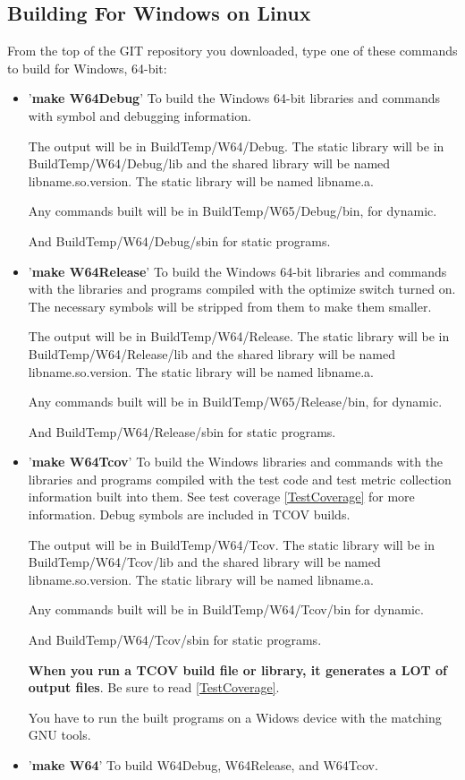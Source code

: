 \subsection{Building For Windows on Linux}
  
From the top of the GIT repository you downloaded,
type one of these commands to build for Windows, 64-bit:

\begin{itemize}
\item '\textbf{make W64Debug}'
  To build the Windows 64-bit libraries and commands with symbol
  and debugging information.

  The output will be in BuildTemp/W64/Debug.
  The static library will be in BuildTemp/W64/Debug/lib
  and the shared library will be named lib{name}.so.{version}.
  The static library will be named lib{name}.a.
  
  Any commands built will be in BuildTemp/W65/Debug/bin,
  for dynamic.
  
  And BuildTemp/W64/Debug/sbin for static programs.

\item '\textbf{make W64Release}'
  To build the Windows 64-bit libraries and commands with the libraries
  and programs compiled with the optimize switch turned on.
  The necessary symbols will be stripped from them to make
  them smaller.

  The output will be in BuildTemp/W64/Release.
  The static library will be in BuildTemp/W64/Release/lib
  and the shared library will be named lib{name}.so.{version}.
  The static library will be named lib{name}.a.
  
  Any commands built will be in BuildTemp/W65/Release/bin,
  for dynamic.
  
  And BuildTemp/W64/Release/sbin for static programs.
  
\item '\textbf{make W64Tcov}'
  To build the Windows libraries and commands with the libraries
  and programs compiled with the test code and test metric
  collection information built into them.
  See test coverage \ref{TestCoverage} for more information.
  Debug symbols are included in TCOV builds.

  The output will be in BuildTemp/W64/Tcov.
  The static library will be in BuildTemp/W64/Tcov/lib
  and the shared library will be named lib{name}.so.{version}.
  The static library will be named lib{name}.a.
  
  Any commands built will be in BuildTemp/W64/Tcov/bin
  for dynamic.

  And BuildTemp/W64/Tcov/sbin for static programs.

  \textbf{When you run a TCOV build file or library, it generates a LOT of  output files}. Be sure to read \ref{TestCoverage}.
  
  You have to run the built programs on a Widows device
  with the matching GNU tools.
  
\item '\textbf{make W64}'
  To build W64Debug, W64Release, and W64Tcov.
\end{itemize}

